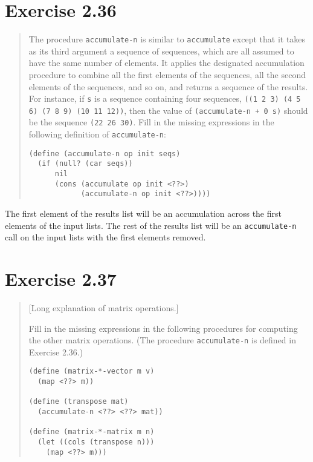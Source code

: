 \documentclass{article}
\begin{document}
\section{Exercise 2.36}
\begin{quote}
    The procedure \texttt{accumulate-n} is similar to \texttt{accumulate}
    except that it takes as its third argument a sequence of sequences, which
    are all assumed to have the same number of elements. It applies the
    designated accumulation procedure to combine all the first elements of the
    sequences, all the second elements of the sequences, and so on, and returns
    a sequence of the results. For instance, if \texttt{s} is a sequence
    containing four sequences, \texttt{((1 2 3) (4 5 6) (7 8 9) (10 11 12))},
    then the value of \texttt{(accumulate-n + 0 s)} should be the sequence
    \texttt{(22 26 30)}. Fill in the missing expressions in the following
    definition of \texttt{accumulate-n}:
    \begin{lstlisting}
(define (accumulate-n op init seqs)
  (if (null? (car seqs))
      nil
      (cons (accumulate op init <??>)
            (accumulate-n op init <??>))))
    \end{lstlisting}
\end{quote}

The first element of the results list will be an accumulation across the first
elements of the input lists. The rest of the results list will be an
\texttt{accumulate-n} call on the input lists with the first elements removed.


\section{Exercise 2.37}
\begin{quote}
    [Long explanation of matrix operations.]

    Fill in the missing expressions in the following procedures for computing
    the other matrix operations. (The procedure \texttt{accumulate-n} is
    defined in Exercise 2.36.)
    \begin{lstlisting}
(define (matrix-*-vector m v)
  (map <??> m))

(define (transpose mat)
  (accumulate-n <??> <??> mat))

(define (matrix-*-matrix m n)
  (let ((cols (transpose n)))
    (map <??> m)))
    \end{lstlisting}
\end{quote}
\end{document}
